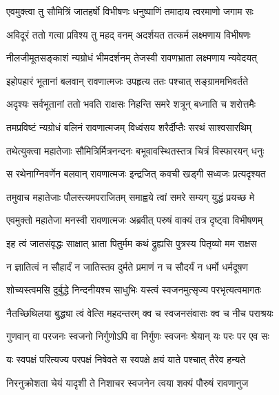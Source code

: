 
\twolineshloka
{एवमुक्त्वा तु सौमित्रिं जातहर्षो विभीषणः}
{धनुष्पाणिं तमादाय त्वरमाणो जगाम सः} %

\twolineshloka
{अविदूरं ततो गत्वा प्रविश्य तु महद् वनम्}
{अदर्शयत तत्कर्म लक्ष्मणाय विभीषणः} %

\twolineshloka
{नीलजीमूतसङ्काशं न्यग्रोधं भीमदर्शनम्}
{तेजस्वी रावणभ्राता लक्ष्मणाय न्यवेदयत्} %

\twolineshloka
{इहोपहारं भूतानां बलवान् रावणात्मजः}
{उपहृत्य ततः पश्चात् सङ्ग्राममभिवर्तते} %

\twolineshloka
{अदृश्यः सर्वभूतानां ततो भवति राक्षसः}
{निहन्ति समरे शत्रून् बध्नाति च शरोत्तमैः} %

\twolineshloka
{तमप्रविष्टं न्यग्रोधं बलिनं रावणात्मजम्}
{विध्वंसय शरैर्दीप्तैः सरथं साश्वसारथिम्} %

\twolineshloka
{तथेत्युक्त्वा महातेजाः सौमित्रिर्मित्रनन्दनः}
{बभूवावस्थितस्तत्र चित्रं विस्फारयन् धनुः} %

\twolineshloka
{स रथेनाग्निवर्णेन बलवान् रावणात्मजः}
{इन्द्रजित् कवची खड्गी सध्वजः प्रत्यदृश्यत} %

\twolineshloka
{तमुवाच महातेजाः पौलस्त्यमपराजितम्}
{समाह्वये त्वां समरे सम्यग् युद्धं प्रयच्छ मे} %

\twolineshloka
{एवमुक्तो महातेजा मनस्वी रावणात्मजः}
{अब्रवीत् परुषं वाक्यं तत्र दृष्ट्वा विभीषणम्} %

\twolineshloka
{इह त्वं जातसंवृद्धः साक्षात् भ्राता पितुर्मम}
{कथं द्रुह्यसि पुत्रस्य पितृव्यो मम राक्षस} %

\twolineshloka
{न ज्ञातित्वं न सौहार्दं न जातिस्तव दुर्मते}
{प्रमाणं न च सौदर्यं न धर्मो धर्मदूषण} %

\twolineshloka
{शोच्यस्त्वमसि दुर्बुद्धे निन्दनीयश्च साधुभिः}
{यस्त्वं स्वजनमुत्सृज्य परभृत्यत्वमागतः} %

\twolineshloka
{नैतच्छिथिलया बुद्ध्या त्वं वेत्सि महदन्तरम्}
{क्व च स्वजनसंवासः क्व च नीच पराश्रयः} %

\twolineshloka
{गुणवान् वा परजनः स्वजनो निर्गुणोऽपि वा}
{निर्गुणः स्वजनः श्रेयान् यः परः पर एव सः} %

\twolineshloka
{यः स्वपक्षं परित्यज्य परपक्षं निषेवते}
{स स्वपक्षे क्षयं याते पश्चात् तैरेव हन्यते} %

\twolineshloka
{निरनुक्रोशता चेयं यादृशी ते निशाचर}
{स्वजनेन त्वया शक्यं पौरुषं रावणानुज} %

